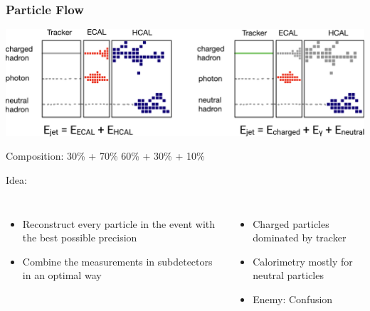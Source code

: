 \documentclass{beamer}
\newcommand{\bluetext}[1]{%
  \textcolor{myBlue}{#1}
}
\begin{document}
\begin{frame}
  \frametitle{Particle Flow}

  \includegraphics[width=\linewidth]{figures/particle_flow_diagram.pdf}
  \begin{adjustwidth}{-1em}{-1em}
    \vspace{-1.5ex}
    Composition: 30\% + 70\% \hspace{9.5em} 60\% + 30\% + 10\%
  \end{adjustwidth}

  \vspace{0.5em}
  \bluetext{Idea:}
  \begin{columns}[c]
    \begin{itemize}
      \item Reconstruct every particle in the event with the best possible
            precision
      \item Combine the measurements in subdetectors in an optimal way
    \end{itemize}

    \begin{itemize}
      \item Charged particles dominated by tracker
      \item Calorimetry mostly for neutral particles
      \item \bluetext{Enemy: Confusion}
    \end{itemize}
  \end{columns}

\end{frame}
\end{document}
